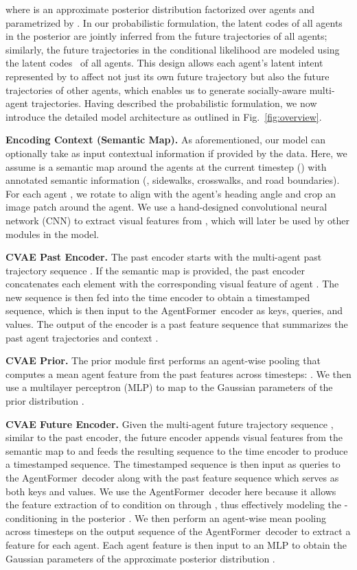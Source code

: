 \documentclass[10pt,twocolumn,letterpaper]{article}
\newcommand{\mname}{AgentFormer}
\begin{document}
where  is an approximate posterior distribution factorized over agents and parametrized by . In our probabilistic formulation, the latent codes  of all agents in the posterior  are jointly inferred from the future trajectories  of all agents; similarly, the future trajectories  in the conditional likelihood  are modeled using the latent codes~ of all agents. This design allows each agent's latent intent represented by  to affect not just its own future trajectory but also the future trajectories of other agents, which enables us to generate socially-aware multi-agent trajectories. Having described the probabilistic formulation, we now introduce the detailed model architecture as outlined in Fig.~\ref{fig:overview}.

\vspace{2mm}
\noindent\textbf{Encoding Context (Semantic Map).}
As aforementioned, our model can optionally take as input contextual information  if provided by the data. Here, we assume  is a semantic map around the agents at the current timestep () with annotated semantic information (\eg, sidewalks, crosswalks, and road boundaries). For each agent , we rotate  to align with the agent's heading angle and crop an image patch  around the agent. We use a hand-designed convolutional neural network (CNN) to extract visual features  from , which will later be used by other modules in the model.

\vspace{2mm}
\noindent\textbf{CVAE Past Encoder.}
The past encoder starts with the multi-agent past trajectory sequence . If the semantic map  is provided, the past encoder concatenates each element  with the corresponding visual feature  of agent . The new sequence is then fed into the time encoder to obtain a timestamped sequence, which is then input to the \mname\ encoder as keys, queries, and values. The output of the encoder is a past feature sequence  that summarizes the past agent trajectories  and context .

\vspace{2mm}
\noindent\textbf{CVAE Prior.}
The prior module first performs an agent-wise pooling that computes a mean agent feature  from the past features across timesteps: . We then use a multilayer perceptron (MLP) to map  to the Gaussian parameters  of the prior distribution .

\vspace{2mm}
\noindent\textbf{CVAE Future Encoder.}
Given the multi-agent future trajectory sequence , similar to the past encoder, the future encoder appends visual features from the semantic map  to  and feeds the resulting sequence to the time encoder to produce a timestamped sequence. The timestamped sequence is then input as queries to the \mname\ decoder along with the past feature sequence  which serves as both keys and values. We use the \mname\ decoder here because it allows the feature extraction of  to condition on  through , thus effectively modeling the -conditioning in the posterior . We then perform an agent-wise mean pooling across timesteps on the output sequence of the \mname\ decoder to extract a feature for each agent. Each agent feature is then input to an MLP to obtain the Gaussian parameters  of the approximate posterior distribution .
\end{document}
